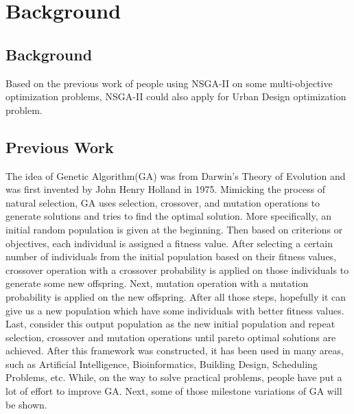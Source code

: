 \chapter{Background}
\label{chap:background}

\section{Background}
Based on the previous work of people using NSGA-II on some multi-objective optimization problems\cite{Magnier_2010_Multiobjective}, NSGA-II could also apply for Urban Design optimization problem. 

\section{Previous Work}

The idea of Genetic Algorithm(GA) was from Darwin's Theory of Evolution and was first invented by John Henry Holland in 1975\cite{Holland_1975_Book}. Mimicking the process of natural selection, GA uses selection, crossover, and mutation operations to generate solutions and tries to find the optimal solution. More specifically, an initial random population is given at the beginning. Then based on criterions or objectives, each individual is assigned a fitness value. After selecting a certain number of individuals from the initial population based on their fitness values, crossover operation with a crossover probability is applied on those individuals to generate some new offspring. Next, mutation operation with a mutation probability is applied on the new offspring. After all those steps, hopefully it can give us a new population which have some individuals with better fitness values. Last, consider this output population as the new initial population and repeat selection, crossover and mutation operations until pareto optimal solutions are achieved. After this framework was constructed, it has been used in many areas, such as Artificial Intelligence, Bioinformatics, Building Design, Scheduling Problems, etc. While, on the way to solve practical problems, people have put a lot of effort to improve GA. Next, some of those milestone variations of GA will be shown.

